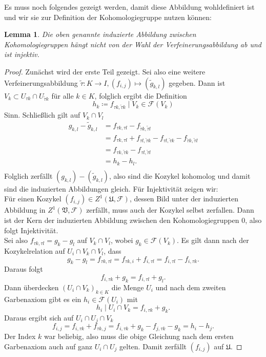 \documentclass[11pt,a4paper,toc=bibliography]{scrartcl}
\theoremstyle{def}
\theoremstyle{thm}
\newtheorem{lemma}[defi]{Lemma}
\theoremstyle{remark}
\begin{document}
Es muss noch folgendes gezeigt werden, damit diese Abbildung wohldefiniert ist und wir sie zur Definition der Kohomologiegruppe nutzen können:
\begin{lemma}
Die oben genannte induzierte Abbildung zwischen Kohomologiegruppen  hängt nicht von der Wahl der Verfeinerungsabbildung ab und ist injektiv.
\end{lemma}
\begin{proof}
Zunächst wird der erste Teil gezeigt. Sei also eine weitere Verfeinerungsabbildung  $\tilde{\tau}:K\rightarrow I, (f_{i,j})\mapsto (\tilde{g}_{k,l})$ gegeben. Dann ist $V_k\subset U_{\tau k}\cap U_{\tilde{\tau}k}$ für alle $k\in K$, folglich ergibt die Definition 
\[
h_k\coloneqq f_{\tau k,\tilde{\tau} k}\mid V_k\in \mathcal{F}(V_k)
\]
Sinn. Schließlich gilt auf $V_k\cap V_l$
\begin{align*}
g_{k,l}-\tilde{g}_{k,l} & =f_{\tau k,\tau l}-f_{\tilde{\tau}k,\tilde{\tau}l}\\
& =f_{\tau k,\tau l} +f_{\tau l,\tilde{\tau}k}-f_{\tau l,\tilde{\tau}k}-f_{\tilde{
\tau} k,\tilde{\tau}l}\\ 
						& = f_{\tau k, \tilde{\tau}k}-f_{\tau l,\tilde{\tau}l}\\
					& = h_k-h_l.\\
\end{align*}
Folglich zerfällt $(g_{k,l})-(\tilde{g}_ {k,l})$, also sind die Kozykel kohomolog und damit sind die induzierten Abbildungen gleich.
Für Injektivität zeigen wir:\\
Für einen Kozykel $(f_{i,j})\in Z^1(\mathfrak{U},\mathcal{F})$, dessen Bild unter der induzierten Abbildung in $Z^1(\mathfrak{V},\mathcal{F})$ zerfällt, muss auch der Kozykel selbst zerfallen.  Dann ist der Kern der induzierten Abbildung zwischen den Kohomologiegruppen $0$, also folgt Injektivität.\\
Sei also $f_{\tau k,\tau l}=g_k-g_l$ auf $V_k\cap V_l$, wobei $g_k\in \mathcal{F}(V_k)$. Es gilt dann nach der Kozykelrelation auf $U_i\cap V_k\cap V_l$, dass
\[
g_k-g_l= f_{\tau k,\tau l}=f_{\tau k,i}+f_{i,\tau l}=f_{i,\tau l}-f_{i,\tau k}.
\]
Daraus folgt
\[
f_{i,\tau k}+g_k = f_{i,\tau l}+g_l.
\]
Dann überdecken $(U_i\cap V_k)_{k\in K}$  die Menge $U_i$ und nach dem zweiten Garbenaxiom gibt es ein $h_i\in \mathcal{F}(U_i)$ mit
\[
h_i\mid U_i\cap V_k = f_{i,\tau k}+g_k.
\]
Daraus ergibt sich auf $U_i\cap U_j\cap V_k$ 
\[
f_{i,j} = f_{i,\tau k}+f_{\tau k,j} = f_{i,\tau k}+g_k-f_{j,\tau k}-g_k=h_i-h_j.
\]
Der Index $k$ war beliebig, also muss die obige Gleichung nach dem ersten Garbenaxiom auch auf ganz $U_i\cap U_j$ gelten. Damit zerfällt $(f_{i,j})$ auf $\mathfrak{U}$.
\end{proof}
\end{document}
